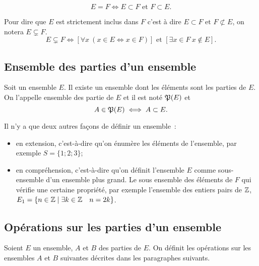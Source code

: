 \begin{prop}
  \begin{equation}
    E = F \iff{}E \subset{}F \textrm{~et~} F \subset{}E.
  \end{equation}
\end{prop}

Pour dire que \(E\) est strictement inclus dans \(F\) c'est à dire \(E \subset{}F
\textrm{~et~} F \not\subset{}E\), on notera \(E \subsetneq F\).
\begin{equation}
  E \subsetneq F \iff{}\left[\forall{}x \ \left(x \in{}E \iff{}x \in{}F \right) \right]
  \textrm{~et~} \left[\exists{}x \in{}F \ x \not\in{}E \right].
\end{equation}

\subsection{Ensemble des parties d'un ensemble}\label{chap3-subsec:ensembledesparties}

\begin{axiome}
  Soit un ensemble \(E\). Il existe un ensemble dont les éléments sont les parties
  de \(E\). On l'appelle ensemble des partie de \(E\) et il est noté \(\mathfrak{P}(E)\)
  et
  \begin{equation}
    A \in{}\mathfrak{P}(E) \iff{}A \subset{}E.
  \end{equation}
\end{axiome}

Il n'y a que deux autres façons de définir un ensemble~:
\begin{itemize}
  \item en extension, c'est-à-dire qu'on énumère les éléments de l'ensemble, par
    exemple \(S = \{1;2;3\}\);
  \item en compréhension, c'est-à-dire qu'on définit l'ensemble \(E\) comme
    sous-ensemble d'un ensemble plus grand. Le sous ensemble des éléments de
    \(F\) qui vérifie une certaine propriété, par exemple l'ensemble des entiers
    pairs de \(\mathbb{Z}\), \(E_1 = \left\{n\in\mathbb{Z}\mathrel{}\middle|\mathrel{}\exists{}k \in{}\mathbb{Z} \quad n = 2k\right\}\).
\end{itemize}

\subsection{Opérations sur les parties d'un ensemble}\label{chap3-subsec:operationparties}

Soient \(E\) un ensemble, \(A\) et \(B\) des parties de \(E\). On définit les
opérations sur les ensembles \(A\) et \(B\) suivantes décrites dans les
paragraphes suivants.

